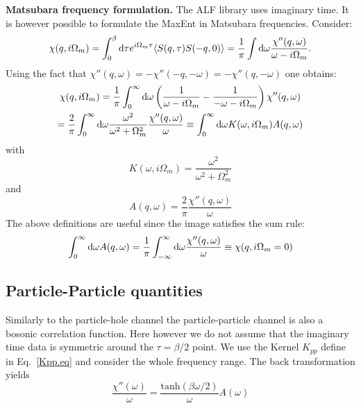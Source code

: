 \noindent
\textbf{Matsubara frequency formulation.}
The ALF  library uses  imaginary time. It is however possible to formulate the MaxEnt in  Matsubara frequencies.
Consider:
\begin{equation}
  \chi(q,i\Omega_m) = \int_0^{\beta} {\text d} \tau  e^{i \Omega_m \tau}
	\langle S(q,\tau) S(-q,0) \rangle  = \frac{1}{\pi}
   \int {\text d} \omega  \frac{\chi''(q,\omega)}{ \omega - i \Omega_m }.
\end{equation}
Using the fact that $\chi''(q,\omega) = -\chi''(-q,-\omega) = -\chi''(q,-\omega)$ one obtains:
\begin{equation}
\begin{gathered}
  \chi(q,i\Omega_m) = 
	\frac{1}{\pi}
   \int_0^{\infty} {\text d} \omega \left(\frac{1}{ \omega - i \Omega_m } - \frac{1}{ -\omega - i \Omega_m } \right)
         \chi''(q,\omega) \\
    = \frac{2}{\pi} \int_0^{\infty} {\text d} \omega \frac{\omega^2}{ \omega^2  + \Omega_m^2 } 
  \frac{\chi''(q,\omega)}{\omega} 
   \equiv \int_0^{\infty} {\text d} \omega K(\omega,i\Omega_m) A(q,\omega)
\end{gathered}
\end{equation}
with
\begin{equation}
   K(\omega,i\Omega_m) = \frac{\omega^2}{ \omega^2  + \Omega_m^2 } 
\end{equation}
and
\begin{equation}
A(q,\omega) =  \frac{2}{\pi}   \frac{\chi''(q,\omega)}{\omega} 
\end{equation}
The above definitions are useful since the image satisfies the sum rule:
\begin{equation}
\int_0^{\infty} {\text d} \omega A(q,\omega) =  \frac{1}{\pi}  \int_{-\infty}^{\infty} {\text d} \omega 
   \frac{\chi''(q,\omega)}{\omega}   \equiv \chi(q,i\Omega_m=0)
\end{equation}


\subsection{Particle-Particle quantities}

Similarly to the particle-hole channel  the particle-particle channel is also a bosonic correlation function. Here however we do not assume that the 
imaginary time data is symmetric around   the $\tau = \beta/2$ point.  We use the Kernel $K_{pp}$ define in Eq.~\ref{Kpp.eq}  and consider the whole frequency range. 
The back transformation  yields
\begin{equation}
 \frac{\chi''(\omega)} {\omega}   = \frac{\text{tanh} \left( \beta \omega/2 \right) }{ \omega }   A(\omega) 
\end{equation}



